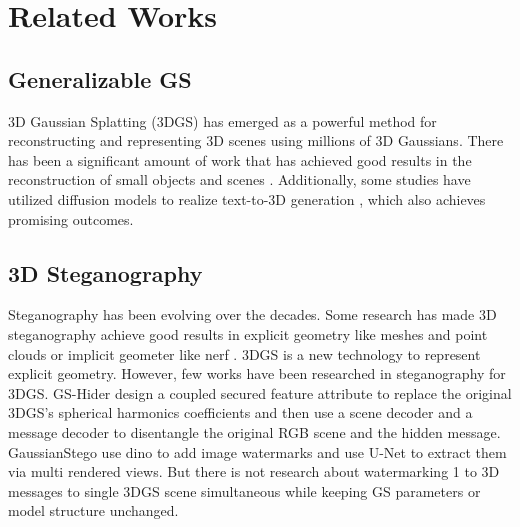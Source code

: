 \section{Related Works}
\subsection{Generalizable GS}
3D Gaussian Splatting (3DGS) \cite{kerbl20233d} has emerged as a powerful method for reconstructing and representing 3D scenes using millions of 3D Gaussians. There has been a significant amount of work that has achieved good results in the reconstruction of small objects \cite{szymanowicz2024splatter} \cite{boss2024sf3d} and scenes \cite{chen2025mvsplat} \cite{charatan2024pixelsplat}. Additionally, some studies have utilized diffusion models to realize text-to-3D generation \cite{li2024instant3d}, which also achieves promising outcomes.

\subsection{3D Steganography}
Steganography has been evolving over the decades. Some research has made 3D steganography achieve good results in explicit geometry like meshes and point clouds \cite{ohbuchi2002frequency} \cite{zhu2024rethinking} \cite{ferreira2020robust} or implicit geometer like nerf \cite{li2023steganerf}\cite{luo2023copyrnerf}. 3DGS is a new technology to represent explicit geometry. However, few works have been researched in steganography for 3DGS. GS-Hider \cite{zhang2024gs}design a coupled secured feature attribute to replace the original 3DGS’s spherical harmonics coefficients and then use a scene decoder and a message decoder to disentangle the original RGB scene and the hidden message. GaussianStego\cite{li2024gaussianstego} use dino to add image watermarks and use U-Net to extract them via multi rendered views. But there is not research about watermarking 1 to 3D messages to single 3DGS scene simultaneous while keeping GS parameters or model structure unchanged.